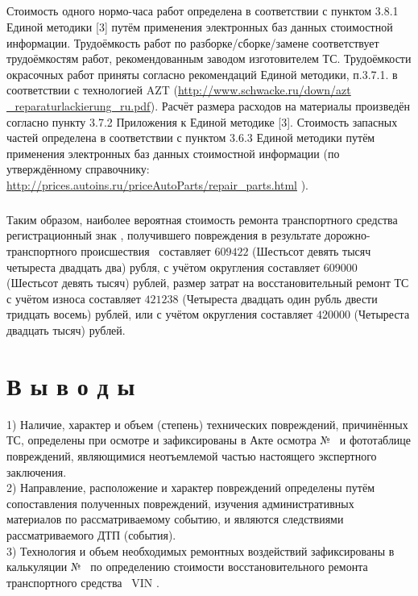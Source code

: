 \subparagraph{}Стоимость одного нормо-часа работ определена в соответствии с пунктом 3.8.1 Единой методики [3] путём применения электронных баз данных стоимостной информации.
      Трудоёмкость работ по разборке/сборке/замене  соответствует трудоёмкостям работ, рекомендованным заводом изготовителем ТС. Трудоёмкости окрасочных работ приняты согласно рекомендаций Единой методики, п.3.7.1. в соответствии с технологией  AZT (\url{http://www.schwacke.ru/down/azt _reparaturlackierung_ru.pdf}). Расчёт размера расходов на материалы произведён  согласно пункту 3.7.2 Приложения к Единой методике [3]. 
      Стоимость запасных частей определена в соответствии с пунктом 3.6.3 Единой методики путём применения электронных баз данных стоимостной информации (по утверждённому справочнику: \url{http://prices.autoins.ru/priceAutoParts/repair_parts.html} ).
  
\subparagraph{}Таким образом,  наиболее вероятная стоимость ремонта транспортного средства \tc\, регистрационный знак , получившего повреждения в результате дорожно-транспортного происшествия  \, составляет $609 422$ (Шестьсот девять тысяч четыреста двадцать два) рубля, с учётом округления составляет $ 609 000 $ (Шестьсот девять тысяч) рублей, размер затрат на восстановительный ремонт ТС с учётом износа составляет  $ 421 238 $ (Четыреста двадцать один рубль двести тридцать восемь) рублей, или с учётом округления составляет $ 420 000 $ (Четыреста двадцать тысяч) рублей.
      

\section{В ы в о д ы}


    1) Наличие, характер и объем (степень) технических повреждений, причинённых ТС, определены при осмотре и зафиксированы в Акте осмотра № \NomerDoc\, и фототаблице повреждений, являющимися неотъемлемой частью настоящего экспертного заключения.\\[3mm]
    
    2) Направление, расположение и характер повреждений определены путём сопоставления полученных повреждений, изучения административных материалов по рассматриваемому событию, и  являются  следствиями рассматриваемого ДТП (события).\\[3mm]
    
    3) Технология и объем необходимых ремонтных воздействий зафиксированы в калькуляции № \NomerDoc\, по определению стоимости восстановительного ремонта транспортного средства \tc\, VIN  \vin. \\[3mm]
    

